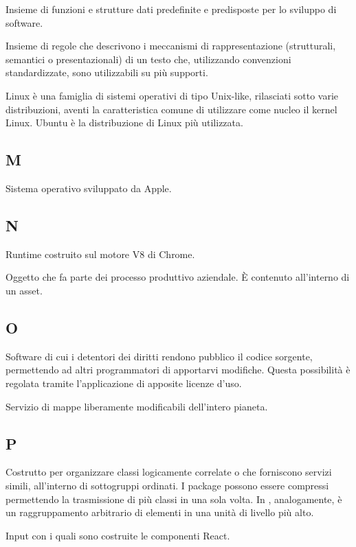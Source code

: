 		Insieme di funzioni e strutture dati predefinite e predisposte per lo sviluppo di software.
		
		Insieme di regole che descrivono i meccanismi di rappresentazione (strutturali, semantici o presentazionali) di un testo che, utilizzando convenzioni standardizzate, sono utilizzabili su più supporti.
		
		Linux è una famiglia di sistemi operativi di tipo Unix-like, rilasciati sotto varie distribuzioni, aventi la caratteristica comune di utilizzare come nucleo il kernel Linux. Ubuntu è la distribuzione di Linux più utilizzata.
	\subsection{M}
		Sistema operativo sviluppato da Apple.
	\subsection{N}
		Runtime  costruito sul motore V8 di Chrome.
	
		Oggetto che fa parte dei processo produttivo aziendale. È contenuto all'interno di un asset.
	\subsection{O}
		Software di cui i detentori dei diritti rendono pubblico il codice sorgente, permettendo ad altri programmatori di apportarvi modifiche. Questa possibilità è regolata tramite l’applicazione di apposite licenze d’uso.
		
		Servizio di mappe liberamente modificabili dell'intero pianeta.
	
	\subsection{P}
	
	Costrutto per organizzare classi logicamente correlate o che forniscono servizi simili, all'interno di sottogruppi ordinati. I package possono essere compressi permettendo la trasmissione di più classi in una sola volta. In , analogamente, è un raggruppamento arbitrario di elementi in una unità di livello più alto.
		
	Input con i quali sono costruite le componenti React.
	
